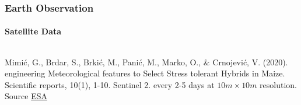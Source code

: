 \documentclass[%
  aspectratio=169,
  9pt,
  USenglish,
]{beamer}
\begin{document}
\begin{frame}
	\frametitle{Earth Observation}
	\framesubtitle{Satellite Data}
	\begin{columns}
			\vspace{-1em}
			
			
			{\tiny Mimić, G., Brdar, S., Brkić, M., Panić, M., Marko, O., \& Crnojević, V. (2020). engineering Meteorological features to Select Stress tolerant Hybrids in Maize. Scientific reports, 10(1), 1-10.}
			Sentinel 2. {\small every 2-5 days at $10m\times10m$ resolution}.
			Source \href{https://www.esa.int/ESA_Multimedia/Videos/2016/08/Sentinel-2_global_coverage}{ESA}
	\end{columns}
\end{frame}
\end{document}
